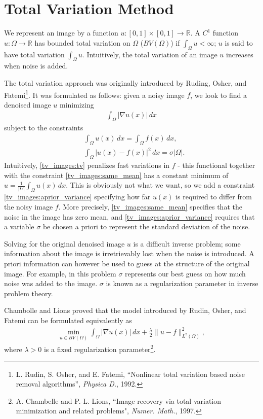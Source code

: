 \section*{Total Variation Method}
We represent an image by a function $u:[0,1]\times[0,1] \to \mathbb{R}$. 
A $C^1$ function $u:\Omega \to \mathbb{R}$ has bounded total variation on $\Omega$ ($BV(\Omega)$) if $\int_{\Omega} u < \infty$; $u$ is said to have total variation $\int_{\Omega} u$.  Intuitively, the total variation of an image $u$ increases when noise is added. 

The total variation approach was originally introduced by Ruding, Osher, and Fatemi\footnote{L. Rudin, S. Osher, and E. Fatemi, ``Nonlinear total variation based noise removal algorithms'', \emph{Physica D.}, 1992.}. It was formulated as follows: given a noisy image $f$, we look to find a denoised image $u$ minimizing 
\begin{align}
\int_{\Omega} |\nabla u(x)|\, dx \label{tv_images:tv}
\end{align}
subject to the constraints 
\begin{align}
	&{ } \int_{\Omega} u(x) \, dx = \int_{\Omega} f(x)\, dx, \label{tv_images:same_mean}\\
	&{ } \int_{\Omega} |u(x) - f(x)|^2\, dx = \sigma |\Omega|.\label{tv_images:aprior_variance}
\end{align}
Intuitively, \eqref{tv_images:tv} penalizes fast variations in $f$ - this functional together with the constraint \eqref{tv_images:same_mean} has a constant minimum of $u = \frac{1}{|\Omega|}\int_{\Omega} u(x) \, dx$. This is obviously not what we want, so we add a constraint \eqref{tv_images:aprior_variance} specifying how far $u(x)$ is required to differ from the noisy image $f$.  More precisely, \eqref{tv_images:same_mean} specifies that the noise in the image has zero mean, and \eqref{tv_images:aprior_variance} requires that a variable $\sigma$ be chosen a priori to represent the standard deviation of the noise. 

Solving for the original denoised image $u$ is a difficult inverse problem; some information about the image is irretrievably lost when the noise is introduced. A priori information can however be used to guess at the structure of the original image.  For example, in this problem $\sigma$ represents our best guess on how much noise was added to the image. $\sigma$ is known as a regularization parameter in inverse problem theory. 

Chambolle and Lions proved that the model introduced by Rudin, Osher, and Fatemi can be formulated equivalently as 
\begin{align}
\min_{u \in BV(\Omega)} \int_{\Omega} | \nabla u(x)|\, dx +\frac{\lambda}{2}\|u-f\|_{L^2(\Omega)}^2,	
\end{align}
where $\lambda >0$ is a fixed regularization parameter\footnote{A. Chambelle and P.-L. Lions, ``Image recovery via total variation minimization and related problems", \emph{Numer. Math.}, 1997.}.













